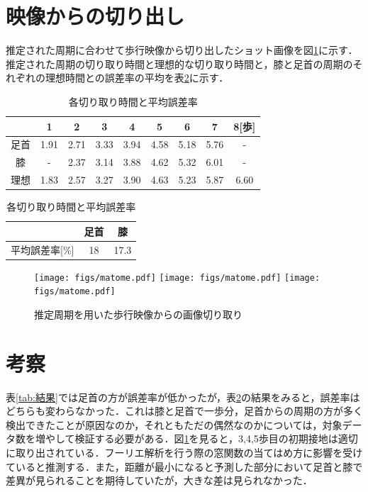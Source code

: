 \documentclass[a4j,10.5pt]{jreport}
\begin{document}
\section{映像からの切り出し}
推定された周期に合わせて歩行映像から切り出したショット画像を図\ref{fig:matome}に示す．推定された周期の切り取り時間と理想的な切り取り時間と，膝と足首の周期のそれぞれの理想時間との誤差率の平均を表\ref{tab:aveerror}に示す．

\begin{table}[H]
\caption{各切り取り時間と平均誤差率}
    \label{tab:aveerror}
    \vspace{5mm}
    \centering
    \begin{tabular}{c|cccccccc}
     & 1 & 2 & 3 & 4 & 5 & 6 & 7 & 8[歩] \\ \hline
足首 &1.91&2.71&3.33&3.94&4.58&5.18&5.76&-\\ \hline
膝   &-&2.37&3.14&3.88&4.62&5.32&6.01&-\\ \hline
理想 &1.83&2.57&3.27&3.90&4.63&5.23&5.87&6.60\\ \hline
    \end{tabular}
    \vspace{5mm}
    \newline
    \begin{tabular}{c||cc}
         &  足首&膝\\ \hline
        平均誤差率[\%] & 18&17.3 \\ \hline
    \end{tabular}

\end{table}
\begin{figure}
    \centering
    \texttt{[image: figs/matome.pdf]}
    \texttt{[image: figs/matome.pdf]}
    \texttt{[image: figs/matome.pdf]}
    \caption{推定周期を用いた歩行映像からの画像切り取り}
    \label{fig:matome}
\end{figure}
\section{考察}
表\ref{tab:結果}では足首の方が誤差率が低かったが，表\ref{tab:aveerror}の結果をみると，誤差率はどちらも変わらなかった．これは膝と足首で一歩分，足首からの周期の方が多く検出できたことが原因なのか，それともただの偶然なのかについては，対象データ数を増やして検証する必要がある．図\ref{fig:matome}を見ると，3,4,5歩目の初期接地は適切に取り出されている．フーリエ解析を行う際の窓関数の当てはめ方に影響を受けていると推測する．また，距離が最小になると予測した部分において足首と膝で差異が見られることを期待していたが，大きな差は見られなかった．
\end{document}
